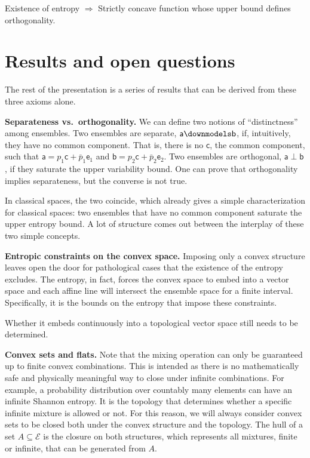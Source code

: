 \documentclass[10pt,twocolumn, nofootinbib]{revtex4-2}
\newcommand{\ens}[1][e] {\mathsf{#1}} %
\newcommand{\Ens}[1][E] {\mathcal{#1}} %
\newcommand\hull{\mathrm{hull}}
\def\separate{\downmodels}
\def\ortho{\perp}
\begin{document}
\begin{tcolorbox}[colback=white, colframe=black]
	Existence of entropy $\Rightarrow$ Strictly concave function whose upper bound defines orthogonality.
\end{tcolorbox}

\section{Results and open questions}

The rest of the presentation is a series of results that can be derived from these three axioms alone.

\textbf{Separateness vs.~orthogonality.} We can define two notions of ``distinctness'' among ensembles. Two ensembles are separate, $\ens[a] \separate \ens[b]$, if, intuitively, they have no common component. That is, there is no $\ens[c]$, the common component, such that $\ens[a] = p_1 \ens[c] + \bar{p}_1 \ens_1$ and $\ens[b] = p_2 \ens[c] + \bar{p}_2 \ens_2$. Two ensembles are orthogonal, $\ens[a] \ortho \ens[b]$, if they saturate the upper variability bound. One can prove that orthogonality implies separateness, but the converse is not true.

In classical spaces, the two coincide, which already gives a simple characterization for classical spaces: two ensembles that have no common component saturate the upper entropy bound. A lot of structure comes out between the interplay of these two simple concepts.

\textbf{Entropic constraints on the convex space.} Imposing only a convex structure leaves open the door for pathological cases that the existence of the entropy excludes. The entropy, in fact, forces the convex space to embed into a vector space and each affine line will intersect the ensemble space for a finite interval. Specifically, it is the bounds on the entropy that impose these constraints.

Whether it embeds continuously into a topological vector space still needs to be determined.

\textbf{Convex sets and flats.} Note that the mixing operation can only be guaranteed up to finite convex combinations. This is intended as there is no mathematically safe and physically meaningful way to close under infinite combinations. For example, a probability distribution over countably many elements can have an infinite Shannon entropy. It is the topology that determines whether a specific infinite mixture is allowed or not. For this reason, we will always consider convex sets to be closed both under the convex structure and the topology. The $\hull$ of a set $A \subseteq \Ens$ is the closure on both structures, which represents all mixtures, finite or infinite, that can be generated from $A$.
\end{document}
